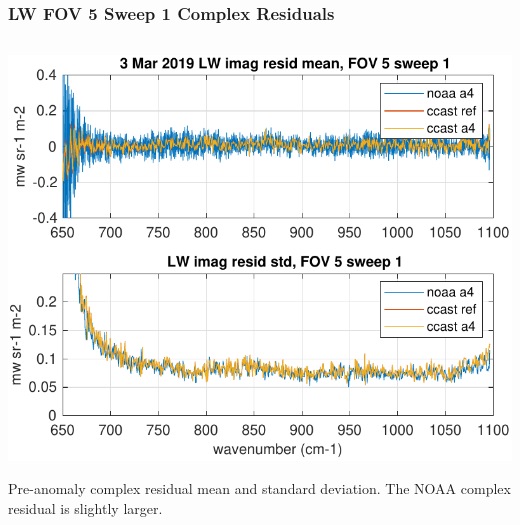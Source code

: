 \documentclass[10pt]{beamer}
\begin{document}
\begin{frame}
\begin{columns}[t]
\begin{column}{0.5\textwidth}
\end{column}
\end{columns}
\end{frame}
\begin{frame}
\frametitle{LW FOV 5 Sweep 1 Complex Residuals}
\begin{columns}[t]
\begin{column}{0.5\textwidth}
  \begin{centering}
  \includegraphics[width=\textwidth]{figures/LW_pre_fail_imag_fov5_sd1.pdf}
  \end{centering}\vspace{3mm}
  Pre-anomaly complex residual mean and standard deviation.  The NOAA complex
  residual is slightly larger.


\end{column}
\end{columns}
\end{frame}
\end{document}
